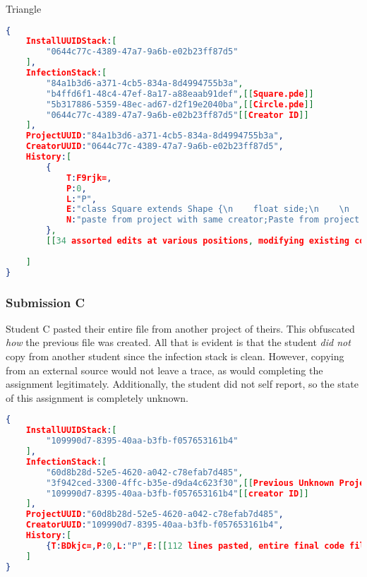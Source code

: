 \documentclass[conference]{IEEEtran}
\newcommand{\n}{\hfill\break}
\begin{document}
Triangle
\begin{lstlisting}[language=json]
{
	InstallUUIDStack:[
		"0644c77c-4389-47a7-9a6b-e02b23ff87d5"
	],
	InfectionStack:[
		"84a1b3d6-a371-4cb5-834a-8d4994755b3a",
		"b4ffd6f1-48c4-47ef-8a17-a88eaab91def",[[Square.pde]]
		"5b317886-5359-48ec-ad67-d2f19e2040ba",[[Circle.pde]]
		"0644c77c-4389-47a7-9a6b-e02b23ff87d5"[[Creator ID]]
	],
	ProjectUUID:"84a1b3d6-a371-4cb5-834a-8d4994755b3a",
	CreatorUUID:"0644c77c-4389-47a7-9a6b-e02b23ff87d5",
	History:[
		{
			T:F9rjk=,
			P:0,
			L:"P",
			E:"class Square extends Shape {\n    float side;\n    \n    Square(float xPos, float yPos) {\n        side = random(height * 0.1);\n        x = xPos;\n        y = yPos;\n        vx = random(2, 7);\n        vy = random(2, 7);\n        colorOfShape = color(random(255), random(255), random(255));\n    }\n    \n    void drawShape() {\n        fill(colorOfShape);\n        square(x, y, side);\n    }\n}",
			N:"paste from project with same creator;Paste from project with UUID b4ffd6f1-48c4-47ef-8a17-a88eaab91def;"
		},
		[[34 assorted edits at various positions, modifying existing code, no copies or pastes]]
		
	]
}
\end{lstlisting}

\subsubsection*{Submission C}
Student C pasted their entire file from another project of theirs.  This obfuscated \textit{how} the previous file was created.  All that is evident is that the student \textit{did not} copy from another student since the infection stack is clean.  However, copying from an external source would not leave a trace, as would completing the assignment legitimately.  Additionally, the student did not self report, so the state of this assignment is completely unknown.
\begin{lstlisting}[language=json]
{
	InstallUUIDStack:[
		"109990d7-8395-40aa-b3fb-f057653161b4"
	],
	InfectionStack:[
		"60d8b28d-52e5-4620-a042-c78efab7d485",
		"3f942ced-3300-4ffc-b35e-d9da4c623f30",[[Previous Unknown Project]]
		"109990d7-8395-40aa-b3fb-f057653161b4"[[creator ID]]
	],
	ProjectUUID:"60d8b28d-52e5-4620-a042-c78efab7d485",
	CreatorUUID:"109990d7-8395-40aa-b3fb-f057653161b4",
	History:[
		{T:BDkjc=,P:0,L:"P",E:[[112 lines pasted, entire final code file]],N:"paste from project with same creator;Paste from project with UUID 3f942ced-3300-4ffc-b35e-d9da4c623f30;"}
	]
}
\end{lstlisting}
\end{document}
